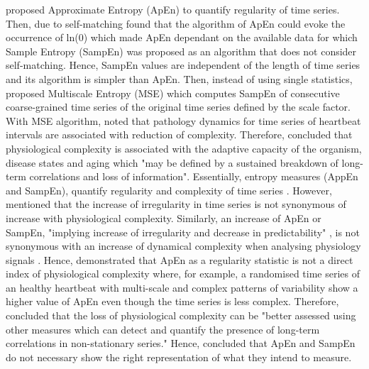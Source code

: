 \cite{pincus1991, pincus1995} proposed Approximate Entropy (ApEn) 
to quantify regularity of time series.
Then, \cite{richman2000} due to self-matching found that the algorithm 
of ApEn could evoke the occurrence of ln(0) which made ApEn dependant 
on the available 
data for which Sample Entropy (SampEn) was proposed as an algorithm that 
does not consider self-matching. 
Hence, SampEn values are independent of the length of time series and its 
algorithm is simpler than ApEn.
Then, instead of using single statistics, \cite{costa2002} proposed 
Multiscale Entropy (MSE) which computes SampEn of consecutive 
coarse-grained time series of the original time series defined by the 
scale factor.
With MSE algorithm, \citep{costa2002} noted that 
pathology dynamics for time series of heartbeat intervals 
are associated with reduction of complexity.
Therefore, \citealt[p. 3]{costa2002} concluded that physiological complexity 
is associated with the adaptive capacity of the organism,  
disease states and aging which "may be defined by a sustained
breakdown of long-term correlations and loss of information".
Essentially, entropy measures (AppEn and SampEn), 
quantify regularity and complexity of time series \citep{preatoni2013}.
However, \cite{goldberger1996} mentioned that the increase of irregularity 
in time series is not synonymous of increase with physiological complexity.
Similarly, an increase of ApEn or SampEn, "implying increase of irregularity 
and decrease in predictability" \cite[p. 25]{goldberger2002b}, is not 
synonymous with an increase of dynamical complexity when analysing physiology 
signals \citep{costa2002}.
Hence, \cite{goldberger2002b} demonstrated that ApEn as a regularity 
statistic is not a direct index of physiological complexity where, for example, 
a randomised time series of an healthy heartbeat with multi-scale and 
complex patterns of variability show a higher value of ApEn even though  
the time series is less complex. Therefore, \citealt[p. 24]{goldberger2002b} 
concluded that the loss of physiological complexity can be 
"better assessed using other measures which can detect and quantify the 
presence of long-term correlations in non-stationary series."
Hence, \cite{goldberger2002b, vaillancourt2002, costa2002} concluded that
ApEn and SampEn do not necessary show the right representation of what 
they intend to measure. 

